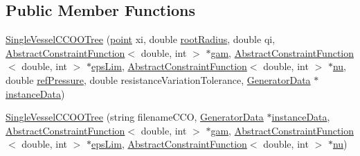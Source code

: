 \subsection*{Public Member Functions}
\begin{DoxyCompactItemize}
\item 
\hyperlink{class_single_vessel_c_c_o_o_tree_a0151dcbe49ac8b9e792930d702afe890}{Single\+Vessel\+C\+C\+O\+O\+Tree} (\hyperlink{structpoint}{point} xi, double \hyperlink{class_single_vessel_c_c_o_o_tree_a92984c132be3e2eaed34adfc261afa48}{root\+Radius}, double qi, \hyperlink{class_abstract_constraint_function}{Abstract\+Constraint\+Function}$<$ double, int $>$ $\ast$\hyperlink{class_abstract_object_c_c_o_tree_aad315b93744637e18153c4434dac067d}{gam}, \hyperlink{class_abstract_constraint_function}{Abstract\+Constraint\+Function}$<$ double, int $>$ $\ast$\hyperlink{class_abstract_object_c_c_o_tree_a62d3e1ff7e74a6236422273f58fc6012}{eps\+Lim}, \hyperlink{class_abstract_constraint_function}{Abstract\+Constraint\+Function}$<$ double, int $>$ $\ast$\hyperlink{class_abstract_object_c_c_o_tree_a92e6b6d1a2fac7331eee34fb28158828}{nu}, double \hyperlink{class_abstract_object_c_c_o_tree_ae7215e6237e4d04625a0c96be9f3578d}{ref\+Pressure}, double resistance\+Variation\+Tolerance, \hyperlink{class_generator_data}{Generator\+Data} $\ast$\hyperlink{class_abstract_object_c_c_o_tree_aca7aecbd89dadc46dd9dce14cfde31e1}{instance\+Data})
\item 
\hyperlink{class_single_vessel_c_c_o_o_tree_ae26fe0d30497926f2ea0f043d4d19804}{Single\+Vessel\+C\+C\+O\+O\+Tree} (string filename\+C\+CO, \hyperlink{class_generator_data}{Generator\+Data} $\ast$\hyperlink{class_abstract_object_c_c_o_tree_aca7aecbd89dadc46dd9dce14cfde31e1}{instance\+Data}, \hyperlink{class_abstract_constraint_function}{Abstract\+Constraint\+Function}$<$ double, int $>$ $\ast$\hyperlink{class_abstract_object_c_c_o_tree_aad315b93744637e18153c4434dac067d}{gam}, \hyperlink{class_abstract_constraint_function}{Abstract\+Constraint\+Function}$<$ double, int $>$ $\ast$\hyperlink{class_abstract_object_c_c_o_tree_a62d3e1ff7e74a6236422273f58fc6012}{eps\+Lim}, \hyperlink{class_abstract_constraint_function}{Abstract\+Constraint\+Function}$<$ double, int $>$ $\ast$\hyperlink{class_abstract_object_c_c_o_tree_a92e6b6d1a2fac7331eee34fb28158828}{nu})
\item 

\end{DoxyCompactItemize}
